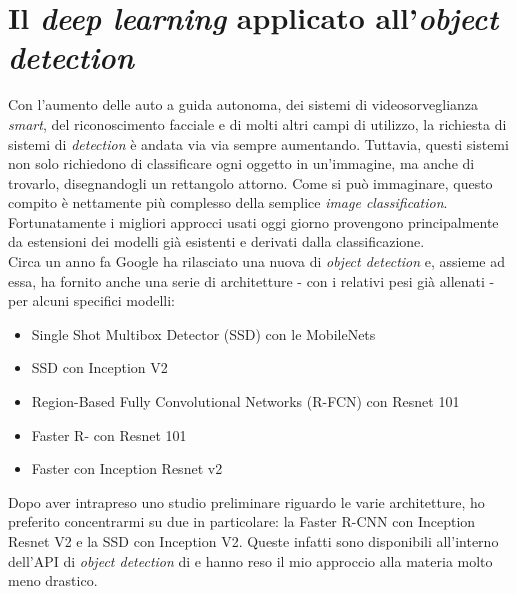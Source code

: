 \section{Il \textit{deep learning} applicato all'\textit{object detection}}
Con l'aumento delle auto a guida autonoma, dei sistemi di videosorveglianza \textit{smart}, del riconoscimento facciale e di molti altri campi di utilizzo, la richiesta di sistemi di  \textit{detection} è andata via via sempre aumentando. Tuttavia, questi sistemi non solo richiedono di classificare ogni oggetto in un'immagine, ma anche di trovarlo, disegnandogli un rettangolo attorno. Come si può immaginare, questo compito è nettamente più complesso della semplice \textit{image classification}. Fortunatamente i migliori approcci usati oggi giorno provengono principalmente da estensioni dei modelli già esistenti e derivati dalla classificazione.
\medskip
\\Circa un anno fa Google ha rilasciato una nuova  di \textit{object detection} e, assieme ad essa, ha fornito anche una serie di architetture - con i relativi pesi già allenati - per alcuni specifici modelli:
\begin{itemize}
	\item Single Shot Multibox Detector (SSD) con le MobileNets
	\item SSD con Inception V2
	\item Region-Based Fully Convolutional Networks (R-FCN) con Resnet 101
	\item Faster R- con Resnet 101
	\item Faster  con Inception Resnet v2
\end{itemize}
Dopo aver intrapreso uno studio preliminare riguardo le varie architetture, ho preferito concentrarmi su due in particolare: la Faster R-CNN con Inception Resnet V2 e la SSD con Inception V2. Queste infatti sono disponibili all'interno dell'API di \textit{object detection}\cite{prod:tensorflow_o_d_api} di \cite{prod:tensorflow} e hanno reso il mio approccio alla materia molto meno drastico.


